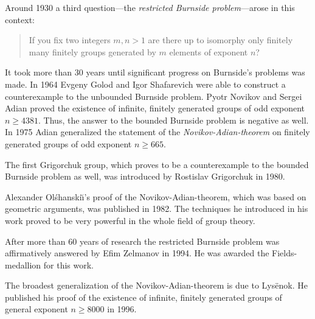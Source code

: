 Around 1930 a third question---the \emph{restricted Burnside problem}---arose in this context:
\begin{quotation}
If you fix two integers $m,n>1$ are there up to isomorphy only finitely many finitely groups generated by $m$ elements of exponent $n$?
\end{quotation}
It took more than 30 years until significant progress on Burnside's problems was made. In 1964 Evgeny Golod and Igor Shafarevich were able to construct a counterexample to the unbounded Burnside problem. Pyotr Novikov and Sergei Adian proved the existence of infinite, finitely generated groups of odd exponent $n\geq 4381$. Thus, the answer to the bounded Burnside problem is negative as well. In 1975 Adian generalized the statement of the \emph{Novikov-Adian-theorem} on finitely generated groups of odd exponent $n\geq 665$.

The first Grigorchuk group, which proves to be a counterexample to the bounded Burnside problem as well, was introduced by Rostislav Grigorchuk in 1980.

Alexander Olśhanski\u\i's proof of the Novikov-Adian-theorem, which was based on geometric arguments, was published in 1982. The techniques he introduced in his work proved to be very powerful in the whole field of group theory.

After more than 60 years of research the restricted Burnside problem was affirmatively answered by Efim Zelmanov in 1994. He was awarded the Fields-medallion for this work.

The broadest generalization of the Novikov-Adian-theorem is due to Lys\"{e}nok. He published his proof of the existence of infinite, finitely generated groups of general exponent $n\geq 8000$ in 1996.
